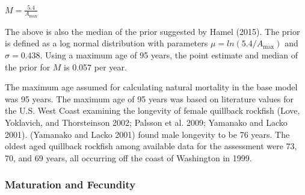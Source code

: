 \documentclass[11pt,
  english,
  a4paper,
]{article}
\begin{document}
\leavevmode\tagmcend\tagstructend\par

\begin{centering}

$M=\frac{5.4}{A_{\text{max}}}$

\end{centering}


The above is also the median of the prior suggested by Hamel {(2015)\leavevmode\tagmcend\tagstructend}. The prior is defined as a log normal distribution with parameters {\(\mu = ln(5.4/A_{\text{max}})\)\leavevmode\tagmcend\tagstructend} and {\(\sigma = 0.438\)\leavevmode\tagmcend\tagstructend}. Using a maximum age of 95 years, the point estimate and median of the prior for {\(M\)\leavevmode\tagmcend\tagstructend} is 0.057 per year.

\leavevmode\tagmcend\tagstructend\par


The maximum age assumed for calculating natural mortality in the base model was 95 years. The maximum age of 95 years was based on literature values for the U.S. West Coast examining the longevity of female quillback rockfish {(Love, Yoklavich, and Thorsteinson 2002; Palsson et al. 2009; Yamanako and Lacko 2001)\leavevmode\tagmcend\tagstructend}. {(Yamanako and Lacko 2001)\leavevmode\tagmcend\tagstructend} found male longevity to be 76 years. The oldest aged quillback rockfish among available data for the assessment were 73, 70, and 69 years, all occurring off the coast of Washington in 1999.

\leavevmode\tagmcend\tagstructend\par


\hypertarget{maturation-and-fecundity}{%
\subsubsection{Maturation and Fecundity}\label{maturation-and-fecundity}}
\end{document}
